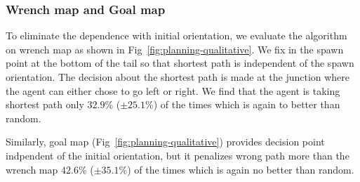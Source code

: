 \subsubsection{Wrench map and Goal map}
To eliminate the dependence with initial orientation, we evaluate the algorithm on wrench map as shown in Fig~\ref{fig:planning-qualitative}. We fix in the spawn point at the bottom of the tail so that shortest path is independent of the spawn orientation.
The decision about the shortest path is made at the junction where the agent can either chose to go left or right.
We find that the agent is taking shortest path only $32.9$\% ($\pm 25.1$\%) of the times which is again to better than random.

Similarly, goal map (Fig~\ref{fig:planning-qualitative}) provides decision point indpendent of the initial orientation, but it penalizes wrong path more than the wrench map $42.6$\% ($\pm 35.1$\%) of the times which is again no better than random.
% 


